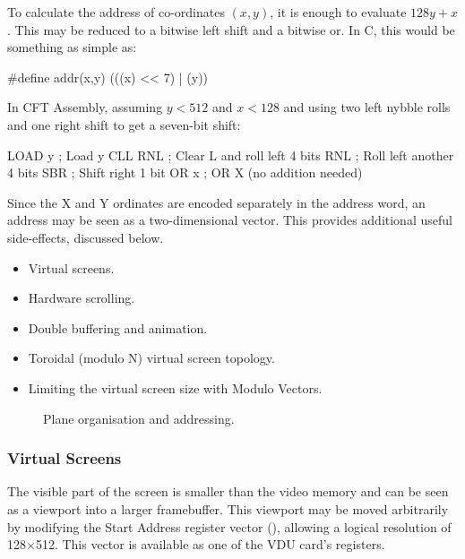 To calculate the address of co-ordinates $(x,y)$, it is enough to
evaluate $128y+x$. This may be reduced to a bitwise left shift and a
bitwise or. In C, this would be something as simple as:

\begin{ccode}
#define addr(x,y) (((x) << 7) | (y))
\end{ccode}

In CFT Assembly, assuming $y < 512$ and $x < 128$ and using two left nybble rolls
and one right shift to get a seven-bit shift:

\begin{cftasmcode}
         LOAD y                      ; Load y
         CLL RNL                     ; Clear L and roll left 4 bits
         RNL                         ; Roll left another 4 bits
         SBR                         ; Shift right 1 bit
         OR x                        ; OR X (no addition needed)
\end{cftasmcode}

\noindent Since the X and Y ordinates are encoded separately in the address word, an
address may be seen as a two-dimensional vector. This provides additional
useful side-effects, discussed below.

\begin{itemize}
\item Virtual screens.
\item Hardware scrolling.
\item Double buffering and animation.
\item Toroidal (modulo N) virtual screen topology.
\item Limiting the virtual screen size with Modulo Vectors. 
\end{itemize}

\begin{figure}
 \centering
 \caption[Plane Organisation]{\label{fig:plane-org} Plane organisation and
   addressing.}
\end{figure}


\subsubsection{Virtual Screens}

The visible part of the screen is smaller than the video memory and can be seen
as a viewport into a larger framebuffer. This viewport may be moved arbitrarily
by modifying the Start Address register vector (), allowing a
logical resolution of 128×512. This vector is available as one of the VDU
card's registers.

